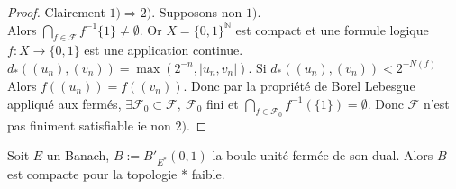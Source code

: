 \begin{proof}
    Clairement $1)\Rightarrow 2).$ Supposons non $1).$ \\
    Alors $\bigcap\limits_{f\in \mathcal{F}} f^{-1} \{1\} \neq \emptyset .$ Or $X=  \{0,1\} ^\mathbb{N} $ est compact et une formule logique $f:X\to \{0,1\} $ est une application continue. $d_*\left( (u_n),(v_n) \right) =\max(2^{-n}, |u_n,v_n| ).$ Si $d_*\left( (u_n),(v_n) \right)<2^{-N(f)}$ Alors $f\left( (u_n) \right) =f\left( (v_n) \right) .$  Donc par la propriété de Borel Lebesgue appliqué aux fermés, $\exists \mathcal{F_0}\subset \mathcal{F},\ \mathcal{F_0}$ fini et $\bigcap\limits_{f\in \mathcal{F_0}} f^{-1} (\{1\})=\emptyset . $ Donc $\mathcal{F}$ n'est pas finiment satisfiable ie non $2)$.
\end{proof}
\begin{theoreme}
    Soit $E$ un Banach, $B:=B'_{E^*}(0,1)$ la boule unité fermée de son dual. Alors $B$ est compacte pour la topologie * faible.
\end{theoreme}
